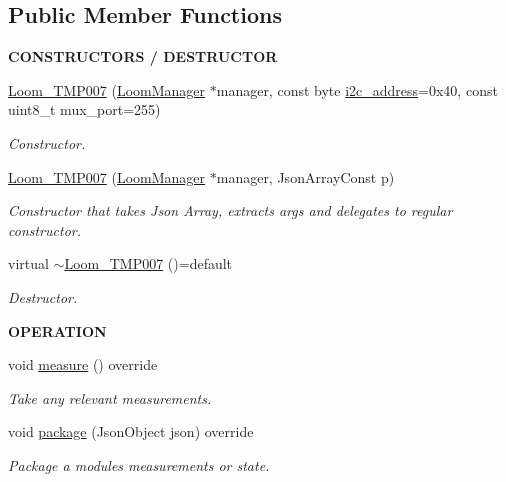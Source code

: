 \subsection*{Public Member Functions}
\begin{Indent}{\bf C\+O\+N\+S\+T\+R\+U\+C\+T\+O\+RS / D\+E\+S\+T\+R\+U\+C\+T\+OR}\par
\begin{DoxyCompactItemize}
\item 
\hyperlink{class_loom___t_m_p007_ac50be7567182233540cf3c4eec65fc59}{Loom\+\_\+\+T\+M\+P007} (\hyperlink{class_loom_manager}{Loom\+Manager} $\ast$manager, const byte \hyperlink{class_loom_i2_c_sensor_a6ff389c1f015152a9ebfccb037d3d90e}{i2c\+\_\+address}=0x40, const uint8\+\_\+t mux\+\_\+port=255)
\begin{DoxyCompactList}\small\item\em Constructor. \end{DoxyCompactList}\item 
\hyperlink{class_loom___t_m_p007_acef41b3a17130350bdb320e91314d47c}{Loom\+\_\+\+T\+M\+P007} (\hyperlink{class_loom_manager}{Loom\+Manager} $\ast$manager, Json\+Array\+Const p)
\begin{DoxyCompactList}\small\item\em Constructor that takes Json Array, extracts args and delegates to regular constructor. \end{DoxyCompactList}\item 
virtual \hyperlink{class_loom___t_m_p007_afb953afd9f04840e46431ce77fbad6a3}{$\sim$\+Loom\+\_\+\+T\+M\+P007} ()=default
\begin{DoxyCompactList}\small\item\em Destructor. \end{DoxyCompactList}\end{DoxyCompactItemize}
\end{Indent}
\begin{Indent}{\bf O\+P\+E\+R\+A\+T\+I\+ON}\par
\begin{DoxyCompactItemize}
\item 
void \hyperlink{class_loom___t_m_p007_a07ac672973fca3d8e812a26c8233af18}{measure} () override
\begin{DoxyCompactList}\small\item\em Take any relevant measurements. \end{DoxyCompactList}\item 
void \hyperlink{class_loom___t_m_p007_a15de2056a158e8ec1662b6760ecb66e6}{package} (Json\+Object json) override
\begin{DoxyCompactList}\small\item\em Package a modules measurements or state. \end{DoxyCompactList}\end{DoxyCompactItemize}
\end{Indent}
